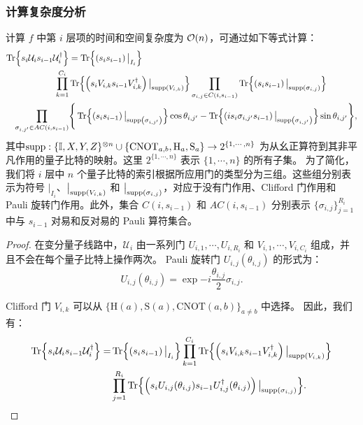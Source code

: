 \subsubsection{计算复杂度分析}
\begin{proposition}\label{prop:layer_terms}
    计算 $f$ 中第 $i$ 层项的时间和空间复杂度为 $\order{n}$，可通过如下等式计算：
    \begin{equation}\label{eq:i-layer_terms}
    \begin{aligned}
    \Tr{s_i\mathcal{U}_i s_{i-1}\mathcal{U}_i^\dagger}&=\Tr{\left(s_i s_{i-1}\right)\big|_{I_i}}\\
    \prod_{k=1}^{C_i}&\Tr{\left(s_iV_{i,k} s_{i-1}V_{i,k}^{\dagger}\right)\big|_{\text{supp} \left( V_{i,k} \right)}}\prod_{\sigma_{i,j}\in C(i,s_{i-1})}\Tr{\left(s_i s_{i-1}\right)\big|_{\text{supp} \left( \sigma_{i,j} \right)}}\\
    \prod_{\sigma_{i,j'}\in AC(i,s_{i-1})} &\Bigg\{ \Tr{\left(s_i s_{i-1}\right)\big|_{\text{supp} \left( \sigma_{i,j'} \right)}}\cos{\theta_{i,j'}}- \Tr{\left(is_i \sigma_{i,j'}s_{i-1}\right)\big|_{\text{supp} \left( \sigma_{i,j'} \right)}}\sin{\theta_{i,j'}}  \Bigg\},
    \end{aligned}
    \end{equation}
    其中$\text{supp}:\{\mathbb{I}, X, Y, Z\}^{\otimes n}\cup\{\mathrm{CNOT}_{a,b},\mathrm{H}_a,\mathrm{S}_a\}\rightarrow2^{\{1,\cdots, n\}}$ 为从幺正算符到其非平凡作用的量子比特的映射。这里 $2^{\{1,\cdots, n\}}$ 表示 $\{1,\cdots, n\}$ 的所有子集。
    为了简化，我们将 $i$ 层中 $n$ 个量子比特的索引根据所应用门的类型分为三组。这些组分别表示为符号 $\big|_{I_i}$、$\big|_{\text{supp} \left( V_{i,k} \right)}$ 和 $\big|_{\text{supp} \left( \sigma_{i,j} \right)}$，对应于没有门作用、Clifford 门作用和 Pauli 旋转门作用。此外，集合 $C(i,s_{i-1})$ 和 $AC(i,s_{i-1})$ 分别表示 $\{\sigma_{i,j}\}_{j=1}^{R_i}$ 中与 $s_{i-1}$ 对易和反对易的 Pauli 算符集合。
    
    \begin{proof}
    
    在变分量子线路中，$\mathcal{U}_i$ 由一系列门 $U_{i,1},\cdots,U_{i,R_i}$ 和 $V_{i,1},\cdots,V_{i,C_i}$ 组成，并且不会在每个量子比特上操作两次。
    Pauli 旋转门 $U_{i,j}(\theta_{i,j})$ 的形式为：
    \begin{equation}
      U_{i,j}(\theta_{i,j})=\exp{-i \frac{\theta_{i,j}}{2} \sigma_{i,j}}.
    \end{equation}
    
    Clifford 门 $V_{i,k}$ 可以从 $\{\mathrm{H}(a),\mathrm{S}(a),\mathrm{CNOT}(a,b) \}_ {a\neq b}$ 中选择。
    因此，我们有：
    \begin{equation}
      \begin{aligned}
        \Tr{s_i\mathcal{U}_i s_{i-1}\mathcal{U}_i^\dagger}=&\Tr{\left(s_i s_{i-1}\right)\big|_{I_i}}
        \prod_{k=1}^{C_i}\Tr{\left(s_iV_{i,k} s_{i-1}V_{i,k}^{\dagger}\right)\big|_{\text{supp} \left( V_{i,k} \right)}}\\
        &\prod_{j=1}^{R_i}\Tr{\left(s_i U_{i,j}(\theta_{i,j}) s_{i-1} U_{i,j}^\dagger(\theta_{i,j})\right) \big|_{\text{supp} \left( \sigma_{i,j} \right)}}.
      \end{aligned}
    \end{equation}
    

\end{proof}
\end{proposition}
